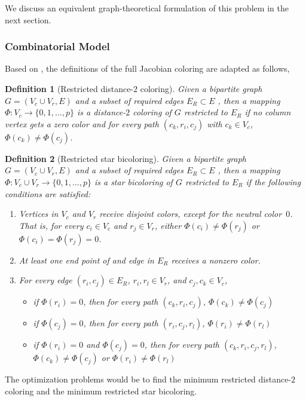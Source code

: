\documentclass[12pt, twoside,a4paper,toc=bibliography]{scrbook}
\newtheorem{definition}{Definition}
\begin{document}
We discuss an equivalent graph-theoretical formulation of this problem in the next
section.

\subsubsection{Combinatorial Model}
Based on \cite{Gebremedhin05whatcolor,Lulfesmann2012Fap}, the definitions
of the full Jacobian coloring are adapted as follows,
\begin{definition}[Restricted distance-$2$ coloring]\label{d.coloring.d2}
Given a bipartite graph $G=(V_c\cup V_r, E)$ and a subset of required edges
$E_R\subset E$ , then a mapping $\Phi:V_c \to
\{0,1,\dots ,p\}$ is a distance-$2$ coloring
of $G$ restricted to $E_R$ if no column vertex gets a zero color and
for every path $(c_k,r_i,c_j)$ with $c_k\in V_c$,
$\Phi(c_k) \neq \Phi(c_j)$.
\end{definition}
\begin{definition}[Restricted star bicoloring]\label{d.coloring.bicol}
Given a bipartite graph $G=(V_c\cup V_r, E)$ and a subset of required edges
$E_R\subset E$ , then a mapping $\Phi:V_c \cup V_r \to
\{0,1,\dots ,p\}$ is a star bicoloring of $G$ restricted to $E_R$
if the following conditions are satisfied:
\begin{enumerate}
\item Vertices in $V_c$ and $V_r$ receive disjoint colors, except for the neutral color~$0$. That
is, for every $c_i \in V_c$ and $r_j \in V_r$, either $\Phi(c_i) \neq \Phi(r_j)$ or
$\Phi(c_i)=\Phi(r_j)=0$.

\item At least one end point of and edge in $E_R$ receives a nonzero color.
\item For every edge $(r_i,c_j)\in E_R$, $r_i, r_l\in V_r$, and
$c_j, c_k\in V_c$,
\begin{itemize}
\item if $\Phi (r_i) = 0$, then for every path $(c_k,r_i,c_j)$, $\Phi (c_k)\neq \Phi (c_j)$
\item if $\Phi (c_j) = 0$, then for every path $(r_i,c_j,r_l)$, $\Phi (r_i)\neq \Phi (r_l)$
\item if $\Phi (r_i) = 0$ and $\Phi (c_j) = 0$, then for every path $(c_k,r_i,c_j,r_l)$,
$\Phi (c_k)\neq \Phi (c_j)$ or $\Phi (r_i)\neq \Phi (r_l)$
\end{itemize}
\end{enumerate}
\end{definition}

The optimization problems would be to
find the minimum restricted distance-$2$ coloring
and the minimum restricted star bicoloring.
\end{document}
